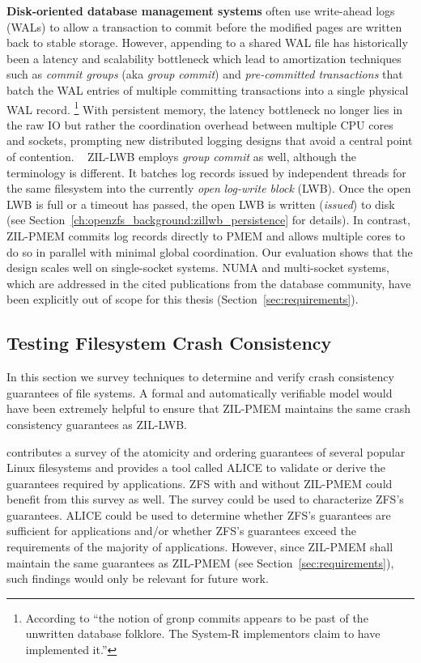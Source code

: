 \documentclass[12pt,a4paper,twoside]{book}
\begin{document}
\textbf{Disk-oriented database management systems} often use write-ahead logs (WALs) to allow a transaction to commit before the modified pages are written back to stable storage.
However, appending to a shared WAL file has historically been a latency and scalability bottleneck which lead to amortization techniques such as \textit{commit groups} (aka \textit{group commit}) and \textit{pre-committed transactions} that batch the WAL entries of multiple committing transactions into a single physical WAL record.%
\footnote{According to \cite{dewittImplementationTechniquesMain1984} ``the notion of gronp commits appears to be past of the unwritten database folklore. The System-R implementors claim to have implemented it.''}
With persistent memory, the latency bottleneck no longer lies in the raw IO but rather the coordination overhead between multiple CPU cores and sockets, prompting new distributed logging designs that avoid a central point of contention.%
~\cite{fangHighPerformanceDatabase2011,pelleyStorageManagementNVRAM2013,johnsonAetherScalableApproach2010}
ZIL-LWB employs \textit{group commit} as well, although the terminology is different.
It batches log records issued by independent threads for the same filesystem into the currently \textit{open} \textit{log-write block} (LWB).
Once the open LWB is full or a timeout has passed, the open LWB is written (\textit{issued}) to disk (see Section~\ref{ch:openzfs_background:zillwb_persistence} for details).
In contrast, ZIL-PMEM commits log records directly to PMEM and allows multiple cores to do so in parallel with minimal global coordination.
Our evaluation shows that the design scales well on single-socket systems.
NUMA and multi-socket systems, which are addressed in the cited publications from the database community, have been explicitly out of scope for this thesis (Section~\ref{sec:requirements}).

\subsection{Testing Filesystem Crash Consistency}
In this section we survey techniques to determine and verify crash consistency guarantees of file systems.
A formal and automatically verifiable model would have been extremely helpful to ensure that ZIL-PMEM maintains the same crash consistency guarantees as ZIL-LWB.

 contributes a survey of the atomicity and ordering guarantees of several popular Linux filesystems and provides a tool called ALICE to validate or derive the guarantees required by applications.
ZFS with and without ZIL-PMEM could benefit from this survey as well.
The survey could be used to characterize ZFS’s guarantees.
ALICE could be used to determine whether ZFS’s guarantees are sufficient for applications and/or whether ZFS’s guarantees exceed the requirements of the majority of applications.
However, since ZIL-PMEM shall maintain the same guarantees as ZIL-PMEM (see Section~\ref{sec:requirements}), such findings would only be relevant for future work.
\end{document}
